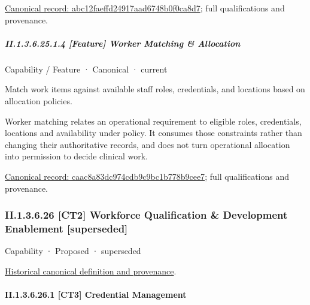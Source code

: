 {\footnotesize \href{../../../../continuum/strategy/capability/feature/abc12faeffd24917aad6748b0f0ca8d7.md}{Canonical record: abc12faeffd24917aad6748b0f0ca8d7}; full qualifications and provenance.}\par
\subparagraph*{II.1.3.6.25.1.4 [Feature] Worker Matching \& Allocation}
\label{navigation:II.1.3.6.25.1.4}

\label{element:caac8a83dc974cdb9c9bc1b778b9cee7}
{\small Capability / Feature · Canonical · current}\par

Match work items against available staff roles, credentials, and locations based on allocation policies.



Worker matching relates an operational requirement to eligible roles, credentials, locations and availability under policy. It consumes those constraints rather than changing their authoritative records, and does not turn operational allocation into permission to decide clinical work.


{\footnotesize \href{../../../../continuum/strategy/capability/feature/caac8a83dc974cdb9c9bc1b778b9cee7.md}{Canonical record: caac8a83dc974cdb9c9bc1b778b9cee7}; full qualifications and provenance.}\par
\subsubsection*{II.1.3.6.26 [CT2] Workforce Qualification \& Development Enablement [superseded]}
\label{navigation:II.1.3.6.26}

\label{element:d24a1f4c4f674c45a95c317998ff4186}
{\small Capability · Proposed · superseded}\par
\href{../../../../continuum/strategy/capability/d24a1f4c4f674c45a95c317998ff4186.md}{Historical canonical definition and provenance}.\par
\paragraph*{II.1.3.6.26.1 [CT3] Credential Management}
\label{navigation:II.1.3.6.26.1}

